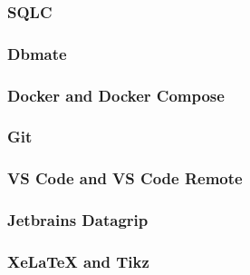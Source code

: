 \subsubsection{SQLC}
\subsubsection{Dbmate}
\subsubsection{Docker and Docker Compose}
\subsubsection{Git}
\subsubsection{VS Code and VS Code Remote}
\subsubsection{Jetbrains Datagrip}
\subsubsection{XeLaTeX and Tikz}